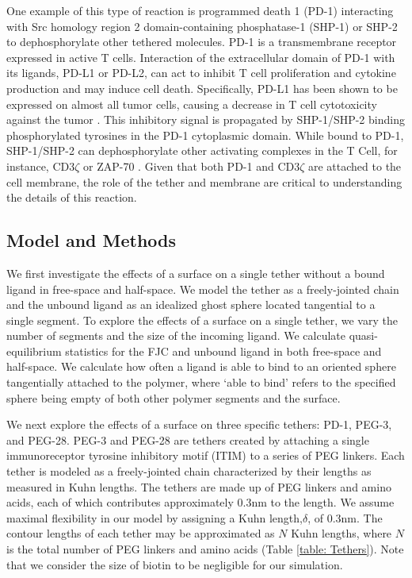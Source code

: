 \documentclass[../../AdvancementSummary.tex]{subfiles}
\begin{document}
One example of this type of reaction is programmed death 1 (PD-1) interacting with Src homology region 2 domain-containing phosphatase-1 (SHP-1) or SHP-2 to dephosphorylate other tethered molecules. PD-1 is a transmembrane receptor expressed in active T cells. Interaction of the extracellular domain of PD-1 with its ligands, PD-L1 or PD-L2, can act to inhibit T cell proliferation and cytokine production and may induce cell death. Specifically, PD-L1 has been shown to be expressed on almost all tumor cells, causing a decrease in T cell cytotoxicity against the tumor \cite{Blank2007, Keir2008}. This inhibitory signal is propagated by SHP-1/SHP-2 binding phosphorylated tyrosines in the PD-1 cytoplasmic domain. While bound to PD-1, SHP-1/SHP-2 can dephosphorylate other activating complexes in the T Cell, for instance, CD3$\zeta$ or ZAP-70 \cite{Yokosuka2012}. Given that both PD-1 and CD3$\zeta$ are attached to the cell membrane, the role of the tether and membrane are critical to understanding the details of this reaction.

\subsection{Model and Methods}

We first investigate the effects of a surface on a single tether without a bound ligand in free-space and half-space. We model the tether as a freely-jointed chain and the unbound ligand as an idealized ghost sphere located tangential to a single segment. To explore the effects of a surface on a single tether, we vary the number of segments and the size of the incoming ligand. We calculate quasi-equilibrium statistics for the FJC and unbound ligand in both free-space and half-space. We calculate how often a ligand is able to bind to an oriented sphere tangentially attached to the polymer, where `able to bind' refers to the specified sphere being empty of both other polymer segments and the surface. 

We next explore the effects of a surface on three specific tethers: PD-1, PEG-3, and PEG-28. PEG-3 and PEG-28 are tethers created by attaching a single immunoreceptor tyrosine inhibitory motif (ITIM) to a series of PEG linkers. Each tether is modeled as a freely-jointed chain characterized by their lengths as measured in Kuhn lengths. The tethers are made up of PEG linkers and amino acids, each of which contributes approximately 0.3nm to the length. We assume maximal flexibility in our model by assigning a Kuhn length,$\delta$, of 0.3nm. The contour lengths of each tether may be approximated as $N$ Kuhn lengths, where $N$ is the total number of PEG linkers and amino acids (Table \ref{table: Tethers}). Note that we consider the size of biotin to be negligible for our simulation. 
\end{document}
